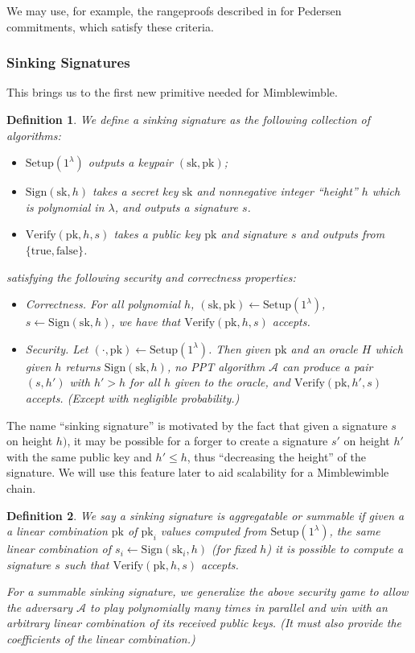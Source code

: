 \documentclass[letterpaper]{article}
\newtheorem{defn}{Definition}
\newcommand{\Setup}{\mathrm{Setup}}
\newcommand{\Sign}{\mathrm{Sign}}
\newcommand{\Verify}{\mathrm{Verify}}
\newcommand{\sk}{\mathrm{sk}}
\newcommand{\pk}{\mathrm{pk}}
\newcommand{\truth}{\{\mathrm{true}, \mathrm{false}\}}
\begin{document}
We may use, for example, the rangeproofs described in \cite{maxwell2015}
for Pedersen commitments, which satisfy these criteria.

\subsubsection{Sinking Signatures}

This brings us to the first new primitive needed for Mimblewimble.

\begin{defn} We define a \emph{sinking signature} as the following
collection of algorithms:
\begin{itemize}
\item $\Setup(1^\lambda)$ outputs a keypair $(\sk, \pk)$;
\item $\Sign(\sk, h)$ takes a secret key $\sk$ and nonnegative integer
``height'' $h$ which is polynomial in $\lambda$, and outputs a signature $s$.
\item $\Verify(\pk, h, s)$ takes a public key $\pk$ and signature $s$ and
outputs from $\truth$.
\end{itemize}
satisfying the following security and correctness properties:
\begin{itemize}
\item Correctness. For all polynomial $h$, $(\sk, \pk)\gets\Setup(1^\lambda)$,
$s\gets\Sign(\sk, h)$, we have that $\Verify(\pk, h, s)$ accepts.
\item Security. Let $(\cdot, \pk)\gets\Setup(1^\lambda)$. Then given $\pk$ and
an oracle $H$ which given $h$ returns $\Sign(\sk, h)$, no PPT algorithm
$\mathcal{A}$ can produce a pair $(s, h')$ with $h'>h$ for all $h$ given to
the oracle, and $\Verify(\pk, h', s)$ accepts.
(Except with negligible probability.)
\end{itemize}\label{sinkingsig}
\end{defn}

The name ``sinking signature'' is motivated by the fact that given a signature
$s$ on height $h)$, it may be possible for a forger to create a signature $s'$
on height $h'$ with the same public key and $h' \leq h$, thus ``decreasing the
height'' of the signature. We will use this feature later to aid scalability for
a Mimblewimble chain.

\begin{defn} We say a sinking signature is \emph{aggregatable} or \emph{summable}
if given a a linear combination $\pk$ of $\pk_i$ values computed from $\Setup(1^\lambda)$,
the same linear combination of $s_i\gets\Sign(\sk_i, h)$ (for fixed $h$) it
is possible to compute a signature $s$ such that $\Verify(\pk, h, s)$ accepts.

For a summable sinking signature, we generalize the above security game to allow
the adversary $\mathcal{A}$ to play polynomially many times in parallel and win
with an arbitrary linear combination of its received public keys. (It must also
provide the coefficients of the linear combination.)
\label{homodef}
\end{defn}
\end{document}
